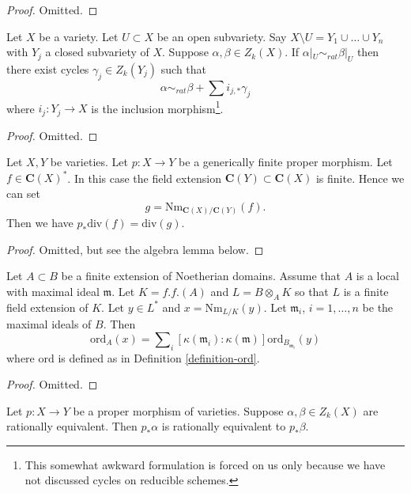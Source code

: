 \begin{proof}
Omitted.
\end{proof}

\begin{lemma}
\label{lemma-restrict-to-open}
Let $X$ be a variety. Let $U \subset X$ be an open subvariety.
Say $X \setminus U = Y_1 \cup \ldots \cup Y_n$ with $Y_j$ a
closed subvariety of $X$. Suppose $\alpha, \beta \in Z_k(X)$.
If $\alpha|_U \sim_{rat} \beta|_U$ then there exist cycles
$\gamma_j \in Z_k(Y_j)$ such that
$$
\alpha \sim_{rat} \beta + \sum i_{j, *} \gamma_j
$$
where $i_j : Y_j \to X$ is the inclusion morphism\footnote{This somewhat
awkward formulation is forced on us only because we have not discussed
cycles on reducible schemes.}.
\end{lemma}

\begin{proof}
Omitted.
\end{proof}

\begin{lemma}
\label{lemma-proper-pushforward-alteration}
Let $X, Y$ be varieties.
Let $p : X \to Y$ be a generically finite proper morphism.
Let $f \in \mathbf{C}(X)^*$. In this case
the field extension
$\mathbf{C}(Y) \subset \mathbf{C}(X)$ is finite.
Hence we can set
$$
g = \text{Nm}_{\mathbf{C}(X)/\mathbf{C}(Y)}(f).
$$
Then we have
$p_*\text{div}(f) = \text{div}(g)$.
\end{lemma}

\begin{proof}
Omitted, but see the algebra lemma below.
\end{proof}

\begin{lemma}
\label{lemma-finite-extension-dim-1}
Let $A \subset B$ be a finite extension of Noetherian domains.
Assume that $A$ is a local with maximal ideal $\mathfrak m$.
Let $K = f.f.(A)$ and $L = B \otimes_A K$ so that $L$ is
a finite field extension of $K$.
Let $y \in L^*$ and $x = \text{Nm}_{L/K}(y)$.
Let $\mathfrak m_i$, $i = 1, \ldots, n$ be the maximal ideals of $B$.
Then
$$
\text{ord}_A(x) =
\sum\nolimits_i
[\kappa(\mathfrak m_i) : \kappa(\mathfrak m)]
\text{ord}_{B_{\mathfrak m_i}}(y)
$$
where $\text{ord}$ is defined as in Definition \ref{definition-ord}.
\end{lemma}

\begin{proof}
Omitted.
\end{proof}

\begin{lemma}
\label{lemma-proper-pushforward-rational-equivalence}
Let $p : X \to Y$ be a proper morphism of varieties.
Suppose $\alpha, \beta \in Z_k(X)$ are rationally equivalent.
Then $p_*\alpha$ is rationally equivalent to $p_*\beta$.
\end{lemma}

